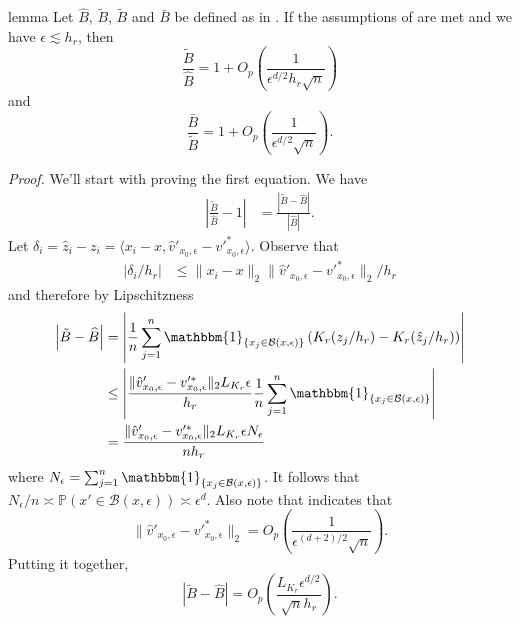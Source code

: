 \documentclass[11pt]{article}
\begin{document}
\begin{restatable}{lemma}{} \label{lemma: regression ratios}
    Let $\widehat{B}$, $\tilde{B}$, $\tilde{B}$ and $\bar{B}$ be defined as in . If the assumptions of  are met and we have $\epsilon \lesssim  h_r$, then
    \begin{equation}
        \frac{\tilde{B}}{\widehat{B}} =  1 +  O_p\left(\frac{1}{\epsilon^{d/2}h_r\sqrt{n}}\right)
    \end{equation}
    and 
    \begin{equation}
        \frac{\bar{B}}{\tilde{B}} = 1 + O_p\left(\frac{1}{\epsilon^{d/2}\sqrt{n}}\right).
    \end{equation}
\end{restatable}
\noindent \textit{Proof.} We'll start with proving the first equation. We have
\begin{align}
    \left|\frac{\tilde{B}}{\widehat{B}} - 1\right| &= \frac{\left|\tilde{B} - \widehat{B}\right|}{\left|\widehat{B}\right|}.
\end{align}
Let $\delta_i = \hat{z}_i - z_i = \langle x_i - x, \hat{v}'_{x_0, \epsilon} - v'^*_{x_0, \epsilon} \rangle$. Observe that
\begin{align*}
    \left|\delta_i/h_r\right| &\leq \|x_i - x\|_2\|\hat{v}'_{x_0, \epsilon} - v'^*_{x_0, \epsilon}\|_2/h_r
\end{align*}
and therefore by Lipschitzness
\begin{align}
    \left|\tilde{B} - \widehat{B}\right| &= \left|\frac{1}{n}\sum_{j = 1}^{n}\mathbbm{1}_{\{x_j \in \mathcal{B}(x, \epsilon)\}}\left(K_r(z_j/h_r) - K_r(\hat{z}_j/h_r)\right)\right| \\
    &\leq \left|\frac{\|\hat{v}'_{x_0, \epsilon} - v'^*_{x_0, \epsilon}\|_2L_{K_r}\epsilon}{h_r}\frac{1}{n}\sum_{j = 1}^{n}\mathbbm{1}_{\{x_j \in \mathcal{B}(x, \epsilon)\}}\right| \\
    &= \frac{\|\hat{v}'_{x_0, \epsilon} - v'^*_{x_0, \epsilon}\|_2L_{K_r}\epsilon N_{\epsilon}}{nh_r}
\end{align}
where $N_\epsilon = \sum_{j = 1}^{n}\mathbbm{1}_{\{x_j \in \mathcal{B}(x, \epsilon)\}}$. It follows that $N_{\epsilon}/n \asymp \mathbb{P}(x' \in \mathcal{B}(x,\epsilon)) \asymp \epsilon^d$. Also note that  indicates that 
\[\|\hat{v}'_{x_0, \epsilon} - v'^*_{x_0, \epsilon}\|_2 = O_p\left(\frac{1}{\epsilon^{(d+2)/2}\sqrt{n}}\right).\]
Putting it together,
\[\left|\tilde{B} - \widehat{B}\right| = O_p\left(\frac{L_{K_r} \epsilon^{d/2}}{\sqrt{n}h_r}\right).\]
\end{document}
